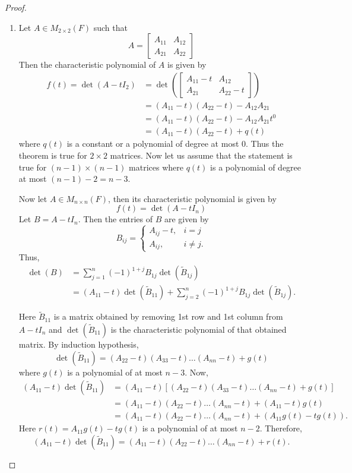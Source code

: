 \documentclass[12pt, a4paper]{article}
\theoremstyle{definition}
\theoremstyle{remark}
\begin{document}
\begin{proof}
\begin{enumerate}
    \item Let $A \in M_{2 \times 2}(F)$ such that
    \[
    A = \begin{bmatrix}
    A_{11} & A_{12} \\
    A_{21} & A_{22}
    \end{bmatrix}
    \]
    Then the characteristic polynomial of $A$ is given by
    \begin{align*}
    f(t) = \det(A - t I_2) &= \det \left( \begin{bmatrix}
    A_{11} - t & A_{12} \\
    A_{21} & A_{22} - t
    \end{bmatrix} \right) \\
    &= (A_{11} - t)(A_{22} - t) - A_{12} A_{21} \\
    &= (A_{11} - t)(A_{22} - t) - A_{12} A_{21} t^0 \\
    &= (A_{11} - t)(A_{22} - t) + q(t)
    \end{align*}
    where $q(t)$ is a constant or a polynomial of degree at most $0$. Thus the theorem is true for $2 \times 2$ matrices. Now let us assume that the statement is true for $(n-1) \times (n-1)$ matrices where $q(t)$ is a polynomial of degree at most $(n-1) - 2 = n - 3$.

    Now let $A \in M_{n \times n}(F)$, then its characteristic polynomial is given by
    \[
    f(t) = \det(A - t I_n)
    \]
    Let $B = A - t I_n$. Then the entries of $B$ are given by
    \[
    B_{ij} = \begin{cases}
    A_{ij} - t, & i = j \\
    A_{ij}, & i \neq j.
    \end{cases}
    \]
    Thus,
    \begin{align*}
    \det(B) &= \sum_{j=1}^{n} (-1)^{1+j} B_{1j} \det(\widetilde{B}_{1j}) \\
    &= (A_{11} - t) \det(\widetilde{B}_{11}) + \sum_{j=2}^{n} (-1)^{1+j} B_{1j} \det(\widetilde{B}_{1j}).
    \end{align*}

    Here $\widetilde{B}_{11}$ is a matrix obtained by removing 1st row and 1st column from $A - t I_n$ and $\det(\widetilde{B}_{11})$ is the characteristic polynomial of that obtained matrix. By induction hypothesis,
    \[
    \det(\widetilde{B}_{11}) = (A_{22} - t)(A_{33} - t) \dots (A_{nn} - t) + g(t)
    \]
    where $g(t)$ is a polynomial of at most $n - 3$. Now,
    \begin{align*}
    (A_{11} - t) \det(\widetilde{B}_{11}) &= (A_{11} - t) \left[ (A_{22} - t)(A_{33} - t) \dots (A_{nn} - t) + g(t) \right] \\
    &= (A_{11} - t)(A_{22} - t) \dots (A_{nn} - t) + (A_{11} - t) g(t) \\
    &= (A_{11} - t)(A_{22} - t) \dots (A_{nn} - t) + \left( A_{11} g(t) - t g(t) \right).
    \end{align*}
    Here $r(t) = A_{11} g(t) - t g(t)$ is a polynomial of at most $n - 2$. Therefore,
    \[
    (A_{11} - t) \det(\widetilde{B}_{11}) = (A_{11} - t)(A_{22} - t) \dots (A_{nn} - t) + r(t).
    \]


\end{enumerate}
\end{proof}
\end{document}
